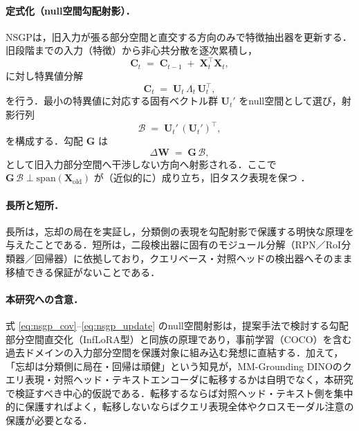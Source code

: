 \paragraph{定式化（null空間勾配射影）．}
NSGPは，旧入力が張る部分空間と直交する方向のみで特徴抽出器を更新する．旧段階までの入力（特徴）から非心共分散を逐次累積し，
\begin{equation}
\mathbf{C}_{t} \;=\; \mathbf{C}_{t-1} \;+\; \mathbf{X}_{t}^{\top}\mathbf{X}_{t},
\label{eq:nsgp_cov}
\end{equation}
に対し特異値分解
\begin{equation}
\mathbf{C}_{t} \;=\; \mathbf{U}_{t}\,\Lambda_{t}\,\mathbf{U}_{t}^{\top},
\label{eq:nsgp_svd}
\end{equation}
を行う．最小の特異値に対応する固有ベクトル群 $\mathbf{U}_{t}'$ をnull空間として選び，射影行列
\begin{equation}
\mathcal{B} \;=\; \mathbf{U}_{t}'\,(\mathbf{U}_{t}')^{\top},
\label{eq:nsgp_proj}
\end{equation}
を構成する．勾配 $\mathbf{G}$ は
\begin{equation}
\Delta\mathbf{W} \;=\; \mathbf{G}\,\mathcal{B},
\label{eq:nsgp_update}
\end{equation}
として旧入力部分空間へ干渉しない方向へ射影される．ここで $\mathbf{G}\,\mathcal{B} \perp \mathrm{span}(\mathbf{X}_{\mathrm{old}})$ が（近似的に）成り立ち，旧タスク表現を保つ \cite{nsgp}．

\paragraph{長所と短所．}
長所は，忘却の局在を実証し，分類側の表現を勾配射影で保護する明快な原理を与えたことである．短所は，二段検出器に固有のモジュール分解（RPN／RoI分類器／回帰器）に依拠しており，クエリベース・対照ヘッドの検出器へそのまま移植できる保証がないことである．

\paragraph{本研究への含意．}
式 \eqref{eq:nsgp_cov}--\eqref{eq:nsgp_update} のnull空間射影は，提案手法で検討する勾配部分空間直交化（InfLoRA型）と同族の原理であり，事前学習（COCO）を含む過去ドメインの入力部分空間を保護対象に組み込む発想に直結する．加えて，「忘却は分類側に局在・回帰は頑健」という知見が，MM-Grounding DINOのクエリ表現・対照ヘッド・テキストエンコーダに転移するかは自明でなく，本研究で検証すべき中心的仮説である．転移するならば対照ヘッド・テキスト側を集中的に保護すればよく，転移しないならばクエリ表現全体やクロスモーダル注意の保護が必要となる．


